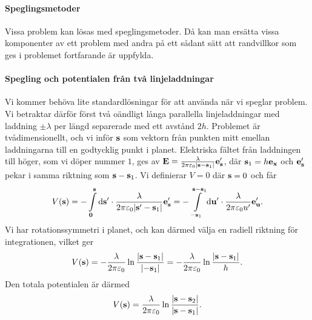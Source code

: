 \paragraph{Speglingsmetoder}
Vissa problem kan lösas med speglingsmetoder. Då kan man ersätta vissa komponenter av ett problem med andra på ett sådant sätt att randvillkor som ges i problemet fortfarande är uppfylda.

\paragraph{Spegling och potentialen från två linjeladdningar}
Vi kommer behöva lite standardlösningar för att använda när vi speglar problem. Vi betraktar därför först två oändligt långa parallella linjeladdningar med laddning $\pm\lambda$ per längd separerade med ett avstånd $2h$. Problemet är tvådimensionellt, och vi inför $\vb{s}$ som vektorn från punkten mitt emellan laddningarna till en godtycklig punkt i planet. Elektriska fältet från laddningen till höger, som vi döper nummer $1$, ges av $\vb{E} = \frac{\lambda}{2\pi\varepsilon_{0}\abs{\vb{s} - \vb{s}_{1}}}\vb{e}_{\vb{s}}'$, där $\vb{s}_{1} = h\vb{e}_{\vb{x}}$ och $\vb{e}_{\vb{s}}'$ pekar i samma riktning som $\vb{s} - \vb{s}_{1}$. Vi definierar $V = 0$ där $\vb{s} = 0$ och får
\begin{align*}
	V(\vb{s}) = -\int\limits_{\vb{0}}^{\vb{s}}\dd{\vb{s'}}\cdot \frac{\lambda}{2\pi\varepsilon_{0}\abs{\vb{s}' - \vb{s}_{1}}}\vb{e}_{\vb{s}}' = -\int\limits_{-\vb{s}_{1}}^{\vb{s} - \vb{s}_{1}}\dd{\vb{u'}}\cdot \frac{\lambda}{2\pi\varepsilon_{0}u'}\vb{e}_{\vb{u}}'.
\end{align*}
Vi har rotationssymmetri i planet, och kan därmed välja en radiell riktning för integrationen, vilket ger
\begin{align*}
	V(\vb{s}) = -\frac{\lambda}{2\pi\varepsilon_{0}}\ln{\frac{\abs{\vb{s} - \vb{s}_{1}}}{\abs{-\vb{s}_{1}}}} = -\frac{\lambda}{2\pi\varepsilon_{0}}\ln{\frac{\abs{\vb{s} - \vb{s}_{1}}}{h}}.
\end{align*}
Den totala potentialen är därmed
\begin{align*}
	V(\vb{s}) = \frac{\lambda}{2\pi\varepsilon_{0}}\ln{\frac{\abs{\vb{s} - \vb{s}_{2}}}{\abs{\vb{s} - \vb{s}_{1}}}}.
\end{align*}

